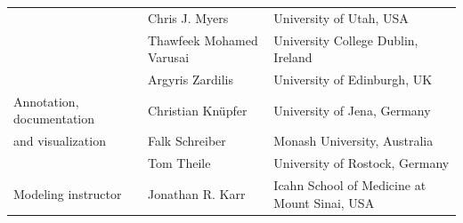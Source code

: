\documentclass[journal,transmag]{IEEEtran}
\begin{document}
\begin{table}[ht!]
\begin{tabularx}{\textwidth}{llX}
                          & Chris J. Myers                   & University of Utah, USA\\
                          & Thawfeek Mohamed Varusai         & University College Dublin, Ireland\\
                          & Argyris Zardilis                 & University of Edinburgh, UK\\
\midrule
Annotation, documentation & Christian Kn\"upfer              & University of Jena, Germany\\
and visualization         & Falk Schreiber                   & Monash University, Australia\\
                          & Tom Theile                       & University of Rostock, Germany\\
\midrule
Modeling instructor       & Jonathan R. Karr                 & Icahn School of Medicine at Mount Sinai, USA\\
\bottomrule
\end{tabularx}
\end{table}
\end{document}
